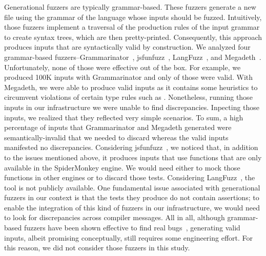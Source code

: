 \documentclass[10pt,conference,anonymous]{IEEEtran}
\begin{document}
Generational fuzzers are typically grammar-based. These fuzzers
generate a new file using the grammar of the language whose inputs
should be fuzzed. Intuitively, those fuzzers implement a traversal of
the production rules of the input grammar to create syntax trees,
which are then pretty-printed. Consequently, this approach produces
inputs that are syntactically valid by construction. We analyzed four
grammar-based fuzzers--Grammarinator~\cite{grammarinator},
jsfunfuzz~\cite{jsfunfuzz},
LangFuzz~\cite{Holler:2012:FCF:2362793.2362831}, and
Megadeth~\cite{grieco2016quickfuzz}.  Unfortunately, none of those
were effective out of the box. For example, we produced 100K inputs
with Grammarinator and only  of those were valid. With
Megadeth, we were able to produce   valid inputs as it
contains some heuristics to circumvent violations of certain type
rules such as . Nonetheless,
running those inputs in our infrastructure we were unable to find
discrepancies. Inpecting those inputs, we realized that they reflected
very simple scenarios. To sum, a high percentage of inputs that
Grammarinator and Megadeth generated were semantically-invalid that we
needed to discard whereas the valid inputs manifested no
discrepancies. Considering jsfunfuzz~\cite{jsfunfuzz}, we noticed
that, in addition to the issues mentioned above, it produces inputs
that use functions that are only available in the SpiderMonkey
engine. We would need either to mock those functions in other engines
or to discard those tests. Considering
LangFuzz~\cite{Holler:2012:FCF:2362793.2362831}, the tool is not
publicly available. One fundamental issue associated with generational
fuzzers in our context is that the tests they produce do not contain
assertions; to enable the integration of this kind of fuzzers in our
infrastructure, we would need to look for discrepancies across
compiler messages.  All in all, although grammar-based fuzzers have
been shown effective to find real
bugs~\cite{Holler:2012:FCF:2362793.2362831}, generating valid inputs,
albeit promising conceptually, still requires some engineering
effort. For this reason, we did not consider those fuzzers in this
study.

\end{document}
